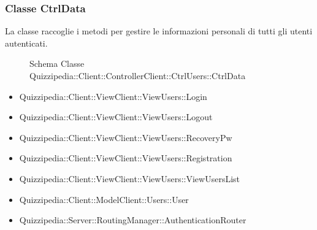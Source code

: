 \subsubsection{Classe CtrlData}
La classe raccoglie i metodi per gestire le informazioni personali di tutti gli utenti autenticati.
\begin{figure}[H]
\centering
\noindent{}
\caption{Schema Classe Quizzipedia::Client::ControllerClient::CtrlUsers::CtrlData}
\end{figure}
\begin{itemize}
\item Quizzipedia::Client::ViewClient::ViewUsers::Login
\item Quizzipedia::Client::ViewClient::ViewUsers::Logout
\item Quizzipedia::Client::ViewClient::ViewUsers::RecoveryPw
\item Quizzipedia::Client::ViewClient::ViewUsers::Registration
\item Quizzipedia::Client::ViewClient::ViewUsers::ViewUsersList
\end{itemize}
\begin{itemize}
\item Quizzipedia::Client::ModelClient::Users::User
\item Quizzipedia::Server::RoutingManager::AuthenticationRouter
\end{itemize}
